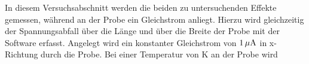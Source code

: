 
In diesem Versuchsabschnitt werden die beiden zu untersuchenden Effekte gemessen, während an der Probe ein Gleichstrom anliegt. Hierzu wird gleichzeitig der Spannungsabfall über die Länge und über die Breite der Probe mit der Software erfasst. Angelegt wird ein konstanter Gleichstrom von $\unit[1]{\mu A}$ in x-Richtung durch die Probe. Bei einer Temperatur von \unit[2]{K} an der Probe wird 



